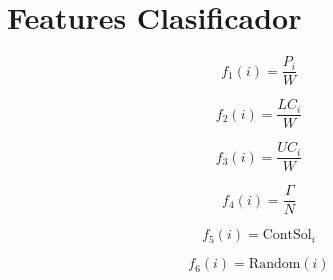 \documentclass[spanish, a4paper, 12pt, openany,final]{book}
\begin{document}
\section{Features Clasificador}
\begin{multicols}{2}
	\label{eq:all_features}
	\begin{equation}
		f_1\left(i\right)   = \frac{P_i}{W}
		\label{feature:1}
	\end{equation}
	
	\begin{equation}
		f_2\left(i\right)   = \frac{LC_i}{W}
		\label{feature:2}
	\end{equation}
	
	\begin{equation}
		f_3\left(i\right)   = \frac{UC_i}{W}
		\label{feature:3}
	\end{equation}
	
	\begin{equation}
		f_4\left(i\right)   = \frac{\Gamma}{N}
		\label{feature:4}
	\end{equation}
	
	\begin{equation}
		f_5\left(i\right)   = \text{ContSol}_i
		\label{feature:5}
	\end{equation}
	
	\begin{equation}
		f_6\left(i\right)   = \text{Random}\left(i\right)
		\label{feature:6}
	\end{equation}

\end{multicols}

\clearpage
\end{document}
